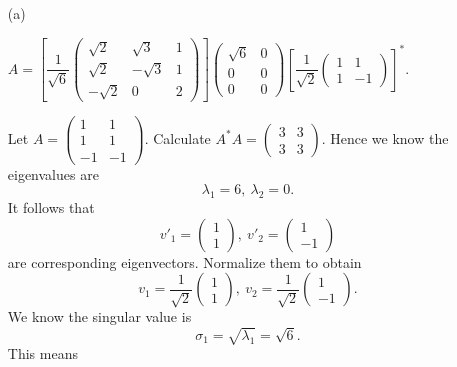 \begin{Exercise}
	\begin{enumerate}[(a)]
		\item[(a)]
		\begin{answer}
			$ A = \left[\dfrac{1}{\sqrt{6}}\begin{pmatrix}
			\sqrt{2} & \sqrt{3} & 1 \\
			\sqrt{2} & -\sqrt{3} & 1 \\
			-\sqrt{2} & 0 & 2
			\end{pmatrix}\right] \begin{pmatrix}
			\sqrt{6} & 0 \\
			0 & 0 \\
			0 & 0
			\end{pmatrix} \left[\dfrac{1}{\sqrt{2}}\begin{pmatrix}
			1 & 1 \\
			1 & -1
			\end{pmatrix}\right]^*$.
		\end{answer}
		\begin{solution}
			Let $A = \begin{pmatrix}
			1 & 1 \\
			1 & 1 \\
			-1 & -1
			\end{pmatrix}$.
			Calculate $A^* A = \begin{pmatrix}
			3 & 3 \\
			3 & 3
			\end{pmatrix}$.
			Hence we know the eigenvalues are
			$$
			\lambda_1 = 6,~ \lambda_2 = 0.
			$$
			It follows that
			$$
			v'_1 = \begin{pmatrix}
			1 \\
			1
			\end{pmatrix},~ v'_2 = \begin{pmatrix}
			1 \\
			-1
			\end{pmatrix}
			$$
			are corresponding eigenvectors.
			Normalize them to obtain
			$$
			v_1 = \dfrac{1}{\sqrt{2}}\begin{pmatrix}
			1 \\
			1
			\end{pmatrix},~ v_2 = \dfrac{1}{\sqrt{2}}\begin{pmatrix}
			1 \\
			-1
			\end{pmatrix}.
			$$
			We know the singular value is
			$$
			\sigma_1 = \sqrt{\lambda_1} = \sqrt{6}.
			$$
			This means

\end{solution}
\end{enumerate}
\end{Exercise}
